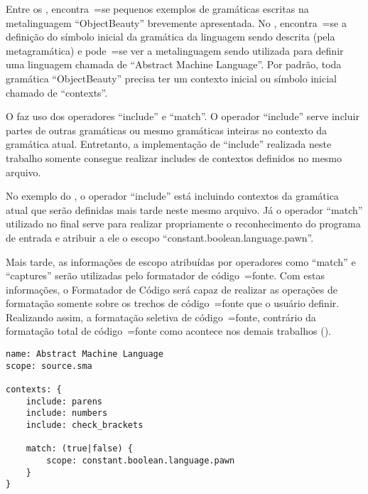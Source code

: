 Entre os ,
encontra~=se pequenos exemplos de gramáticas escritas na metalinguagem ``ObjectBeauty'' brevemente apresentada.
No ,
encontra~=se a definição do símbolo inicial da gramática da linguagem sendo descrita (pela metagramática) e
pode~=se ver a metalinguagem sendo utilizada para definir uma linguagem chamada de ``Abstract Machine Language''.
Por padrão,
toda gramática ``ObjectBeauty'' precisa ter um contexto inicial ou
símbolo inicial chamado de ``contexts''.

O  faz uso dos operadores ``include'' e
``match''.
O operador ``include'' serve incluir partes de outras gramáticas ou
mesmo gramáticas inteiras no contexto da gramática atual.
Entretanto,
a implementação de ``include'' realizada neste trabalho somente consegue realizar includes de contextos definidos no mesmo arquivo.

No exemplo do ,
o operador ``include'' está incluindo contextos da gramática atual que serão definidas mais tarde neste mesmo arquivo.
Já o operador ``match'' utilizado no final serve para realizar propriamente o reconhecimento do programa de entrada e
atribuir a ele o escopo ``constant.boolean.language.pawn''.

Mais tarde,
as informações de escopo atribuídas por operadores como ``match'' e
``captures'' serão utilizadas pelo formatador de código~=fonte.
Com estas informações,
o Formatador de Código será capaz de realizar as operações de formatação somente sobre os trechos de código~=fonte que o usuário definir.
Realizando assim,
a formatação seletiva de código~=fonte,
contrário da formatação total de código~=fonte como acontece nos demais trabalhos ().
\begin{lstlisting}[caption={Exemplo de Gramática -- Símbolo Inicial},label={exemploDeGramaticaPawn1},style=yaml_style]
name: Abstract Machine Language
scope: source.sma

contexts: {
    include: parens
    include: numbers
    include: check_brackets

    match: (true|false) {
        scope: constant.boolean.language.pawn
    }
}
\end{lstlisting}

